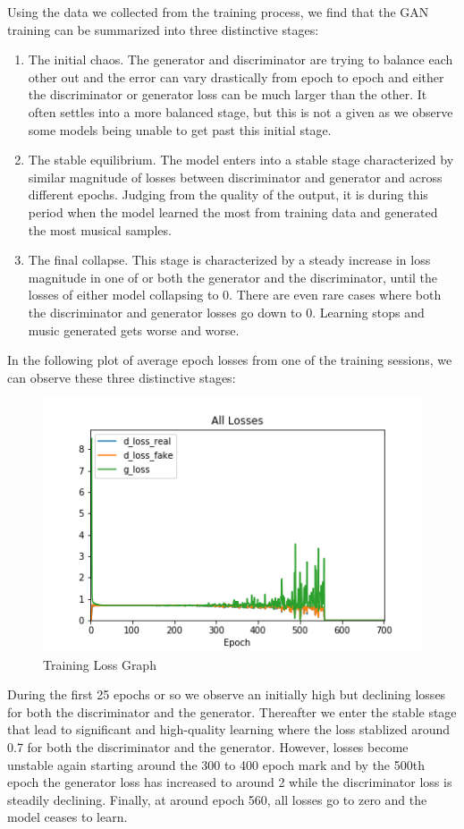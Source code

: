 \documentclass[12pt,oneside]{chicagocapstone}
\providecommand{\tightlist}{%
  \setlength{\itemsep}{0pt}\setlength{\parskip}{0pt}}
\begin{document}
Using the data we collected from the training process, we find that the GAN training can be summarized into three distinctive stages:
\begin{enumerate}
\def\labelenumi{\arabic{enumi}.}
\tightlist
\item
  The initial chaos. The generator and discriminator are trying to balance each other out and the error can vary drastically from epoch to epoch and either the discriminator or generator loss can be much larger than the other. It often settles into a more balanced stage, but this is not a given as we observe some models being unable to get past this initial stage.
\item
  The stable equilibrium. The model enters into a stable stage characterized by similar magnitude of losses between discriminator and generator and across different epochs. Judging from the quality of the output, it is during this period when the model learned the most from training data and generated the most musical samples.
\item
  The final collapse. This stage is characterized by a steady increase in loss magnitude in one of or both the generator and the discriminator, until the losses of either model collapsing to 0. There are even rare cases where both the discriminator and generator losses go down to 0. Learning stops and music generated gets worse and worse.
\end{enumerate}
In the following plot of average epoch losses from one of the training sessions, we can observe these three distinctive stages:
\begin{figure}

{\centering \includegraphics[width=0.3\linewidth]{figure/all_losses_1} 

}

\caption{Training Loss Graph}\label{fig:unnamed-chunk-8}
\end{figure}
During the first 25 epochs or so we observe an initially high but declining losses for both the discriminator and the generator. Thereafter we enter the stable stage that lead to significant and high-quality learning where the loss stablized around 0.7 for both the discriminator and the generator. However, losses become unstable again starting around the 300 to 400 epoch mark and by the 500th epoch the generator loss has increased to around 2 while the discriminator loss is steadily declining. Finally, at around epoch 560, all losses go to zero and the model ceases to learn.
\end{document}

